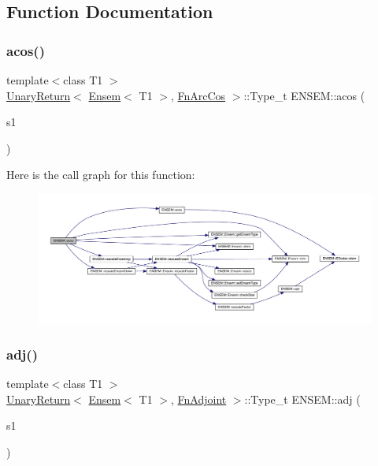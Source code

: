 \subsection{Function Documentation}
\mbox{\label{group__eensem_ga31bcbfa79251bff0ce60e7d8fb2b8ff3}} 
\subsubsection{\texorpdfstring{acos()}{acos()}}
{\footnotesize\ttfamily template$<$class T1 $>$ \\
\mbox{\hyperlink{structENSEM_1_1UnaryReturn}{Unary\+Return}}$<$ \mbox{\hyperlink{classENSEM_1_1Ensem}{Ensem}}$<$ T1 $>$, \mbox{\hyperlink{structENSEM_1_1FnArcCos}{Fn\+Arc\+Cos}} $>$\+::Type\+\_\+t E\+N\+S\+E\+M\+::acos (\begin{DoxyParamCaption}\item[{const \mbox{\hyperlink{classENSEM_1_1Ensem}{Ensem}}$<$ T1 $>$ \&}]{s1 }\end{DoxyParamCaption})\hspace{0.3cm}{\ttfamily [inline]}}

Here is the call graph for this function\+:\nopagebreak
\begin{figure}[H]
\begin{center}
\leavevmode
\includegraphics[width=350pt]{d1/d9e/group__eensem_ga31bcbfa79251bff0ce60e7d8fb2b8ff3_cgraph}
\end{center}
\end{figure}
\mbox{\label{group__eensem_ga3c4b288659953aefecfc3a19bb11f326}} 
\subsubsection{\texorpdfstring{adj()}{adj()}}
{\footnotesize\ttfamily template$<$class T1 $>$ \\
\mbox{\hyperlink{structENSEM_1_1UnaryReturn}{Unary\+Return}}$<$ \mbox{\hyperlink{classENSEM_1_1Ensem}{Ensem}}$<$ T1 $>$, \mbox{\hyperlink{structENSEM_1_1FnAdjoint}{Fn\+Adjoint}} $>$\+::Type\+\_\+t E\+N\+S\+E\+M\+::adj (\begin{DoxyParamCaption}\item[{const \mbox{\hyperlink{classENSEM_1_1Ensem}{Ensem}}$<$ T1 $>$ \&}]{s1 }\end{DoxyParamCaption})\hspace{0.3cm}{\ttfamily [inline]}}

